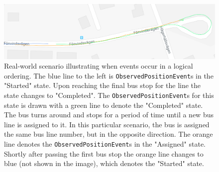\begin{figure}[h!]
    \centering
    \includegraphics[width=1\textwidth]{figures/assigned_completed_working}
    \caption[Real-world scenario illustrating when events occur in a logical ordering]
    {\small Real-world scenario illustrating when events occur in a logical ordering.
    The blue line to the left is \texttt{ObservedPositionEvent}s in the "Started" state.
    Upon reaching the final bus stop for the line the state changes to "Completed".
    The \texttt{ObservedPositionEvent}s for this state is drawn with a green line to denote the "Completed" state.
    The bus turns around and stops for a period of time until a new bus line is assigned to it.
    In this particular scenario, the bus is assigned the same bus line number, but in the opposite direction.
    The orange line denotes the \texttt{ObservedPositionEvent}s in the "Assigned" state.
    Shortly after passing the first bus stop the orange line changes to blue (not shown in the image), which denotes the "Started" state.}
    \label{fig:assigned-before-completed-working}
\end{figure}

